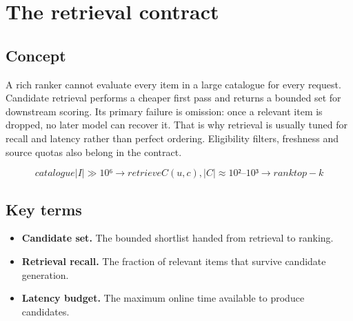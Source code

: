 \section{The retrieval contract}

\begin{abstract}
Retrieval must be fast and generous: shortlist plausible options without trying to finish the ranking.
\end{abstract}

\subsection{Concept}
A rich ranker cannot evaluate every item in a large catalogue for every request. Candidate retrieval performs a cheaper first pass and returns a bounded set for downstream scoring. Its primary failure is omission: once a relevant item is dropped, no later model can recover it. That is why retrieval is usually tuned for recall and latency rather than perfect ordering. Eligibility filters, freshness and source quotas also belong in the contract.

\begin{equation*}
catalogue |I| \gg 10⁶  \rightarrow  retrieve C(u, c), |C| \approx 10²–10³  \rightarrow  rank top-k
\end{equation*}

\subsection{Key terms}
\begin{itemize}
\item \textbf{Candidate set.} The bounded shortlist handed from retrieval to ranking.
\item \textbf{Retrieval recall.} The fraction of relevant items that survive candidate generation.
\item \textbf{Latency budget.} The maximum online time available to produce candidates.
\end{itemize}
